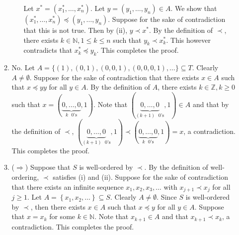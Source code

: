 \documentclass[letterpaper, reqno,11pt]{article}
\newcommand{\ZZ}{\mathbb{Z}}
\newcommand{\NN}{\mathbb{N}}
\begin{document}
\begin{enumerate}
\begin{enumerate}
\begin{enumerate}
            Let $x^* = \left(x_1^*, \ldots, x_n^*\right)$. Let $y = \left(y_1, \ldots, y_n\right) \in A$. We show that $\left(x_1^*, \ldots, x_n^*\right) \preceq \left(y_1, \ldots, y_n\right)$. Suppose for the sake of contradiction that this is not true. Then by (ii), $y \prec x^*$. By the definition of $\prec$, there exists $k \in \NN, 1 \leq k \leq n$ such that $y_k \prec x_k^*$. This however contradicts that $x_k^*  \preceq y_k$. This completes the proof.
        \end{enumerate}
        \item No. Let $A = \{ (1), (0, 1), (0, 0, 1), (0, 0, 0, 1), \ldots \} \subseteq T$. Clearly $A \neq \emptyset$. Suppose for the sake of contradiction that there exists $x \in A$ such that $x \preceq yy$ for all $y \in A$. By the definition of $A$, there exists $k \in \ZZ, k \geq 0$ such that $x = (\underbrace{0, \ldots, 0}_\text{$k$ $0$'s}, 1)$. Note that $(\underbrace{0, \ldots, 0}_\text{$(k + 1)$ $0$'s}, 1) \in A$ and that by the definition of $\prec$, $(\underbrace{0, \ldots, 0}_\text{$(k + 1)$ $0$'s}, 1) \prec (\underbrace{0, \ldots, 0}_\text{$k$ $0$'s}, 1) = x$, a contradiction. This completes the proof.
        \item ($\Longrightarrow$) Suppose that $S$ is well-ordered by $\prec$. By the definition of well-ordering, $\prec$ satisfies (i) and (ii). Suppose for the sake of contradiction that there exists an infinite sequence $x_1, x_2, x_3, \ldots$ with $x_{j + 1} \prec x_j$ for all $j \geq 1$. Let $A = \left\{ x_1, x_2, \ldots \right\} \subseteq S$. Clearly $A \neq \emptyset$. Since $S$ is well-ordered by $\prec$, then there exists $x \in A$ such that $x \preceq y$ for all $y \in A$. Suppose that $x = x_k$ for some $k \in \NN$. Note that $x_{k + 1} \in A$ and that $x_{k + 1} \prec x_k$, a contradiction. This completes the proof.


\end{enumerate}
\end{enumerate}
\end{document}
